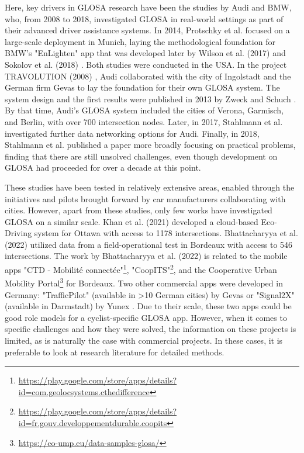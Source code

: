 \nocite{zhao_green_2023, coppola_integrated_2022, seredynski_complementing_2014, seredynski_improving_2014, radivojevic_impact_2016} %

Here, key drivers in GLOSA research have been the studies by Audi and BMW, who, from 2008 to 2018, investigated GLOSA in real-world settings as part of their advanced driver assistance systems. In 2014, Protschky et al. \cite{protschky_extensive_2014, protschky_adaptive_2014} focused on a large-scale deployment in Munich, laying the methodological foundation for BMW's "EnLighten" app that was developed later by Wilson et al. (2017) \cite{wilson_driver_2017} and Sokolov et al. (2018) \cite{sokolov_effects_2018}. Both studies were conducted in the USA. In the project TRAVOLUTION (2008) \cite{braun_travolution-netzweite_2009}, Audi collaborated with the city of Ingolstadt and the German firm Gevas to lay the foundation for their own GLOSA system. The system design and the first results were published in 2013 by Zweck and Schuch \cite{zweck_traffic_2013}. By that time, Audi's GLOSA system included the cities of Verona, Garmisch, and Berlin, with over 700 intersection nodes. Later, in 2017, Stahlmann et al. \cite{stahlmann_multi-hop_2017} investigated further data networking options for Audi. Finally, in 2018, Stahlmann et al. \cite{stahlmann_exploring_2018} published a paper more broadly focusing on practical problems, finding that there are still unsolved challenges, even though development on GLOSA had proceeded for over a decade at this point.

These studies have been tested in relatively extensive areas, enabled through the initiatives and pilots brought forward by car manufacturers collaborating with cities. However, apart from these studies, only few works have investigated GLOSA on a similar scale. Khan et al. (2021) \cite{khan_eco-drive_2021} developed a cloud-based Eco-Driving system for Ottawa with access to 1178 intersections. Bhattacharyya et al. (2022) \cite{bhattacharyya_assessing_2022} utilized data from a field-operational test in Bordeaux with access to 546 intersections. The work by Bhattacharyya et al. (2022) \cite{bhattacharyya_assessing_2022} is related to the mobile apps "CTD - Mobilité connectée"\footnote{\url{https://play.google.com/store/apps/details?id=com.geolocsystems.cthedifference}}, "CoopITS"\footnote{\url{https://play.google.com/store/apps/details?id=fr.gouv.developpementdurable.coopits}}, and the Cooperative Urban Mobility Portal\footnote{\url{https://co-ump.eu/data-samples-glosa/}} for Bordeaux. Two other commercial apps were developed in Germany: "TrafficPilot" (available in >10 German cities) by Gevas or "Signal2X" (available in Darmstadt) by Yunex \cite{yunex_traffic_v2x-kommunikation_2023}. Due to their scale, these two apps could be good role models for a cyclist-specific GLOSA app. However, when it comes to specific challenges and how they were solved, the information on these projects is limited, as is naturally the case with commercial projects. In these cases, it is preferable to look at research literature for detailed methods. 

